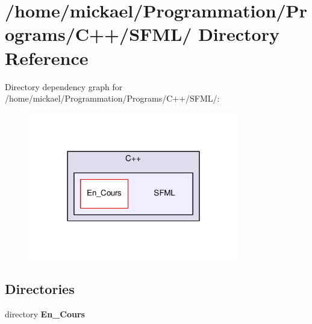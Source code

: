 \section{/home/mickael/\-Programmation/\-Programs/\-C++/\-S\-F\-M\-L/ Directory Reference}
\label{dir_995770632ef8c7b2995f283eb8ae3575}
Directory dependency graph for /home/mickael/\-Programmation/\-Programs/\-C++/\-S\-F\-M\-L/\-:\nopagebreak
\begin{figure}[H]
\begin{center}
\leavevmode
\includegraphics[width=260pt]{dir_995770632ef8c7b2995f283eb8ae3575_dep}
\end{center}
\end{figure}
\subsection*{Directories}
\begin{DoxyCompactItemize}
\item 
directory {\bf En\-\_\-\-Cours}
\end{DoxyCompactItemize}
